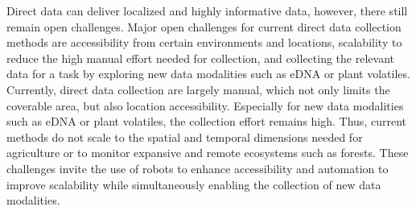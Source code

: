 

Direct data can deliver localized and highly informative data, however, there still remain open challenges.
Major open challenges for current direct data collection methods are accessibility from certain environments and locations, scalability to reduce the high manual effort needed for collection, and collecting the relevant data for a task by exploring new data modalities such as eDNA or plant volatiles.
Currently, direct data collection are largely manual, which not only limits the coverable area, but also location accessibility. Especially for new data modalities such as eDNA or plant volatiles, the collection effort remains high. Thus, current methods do not scale to the spatial and temporal dimensions needed for agriculture or to monitor expansive and remote ecosystems such as forests. These challenges invite the use of robots to enhance accessibility and automation to improve scalability while simultaneously enabling the collection of new data modalities. %

